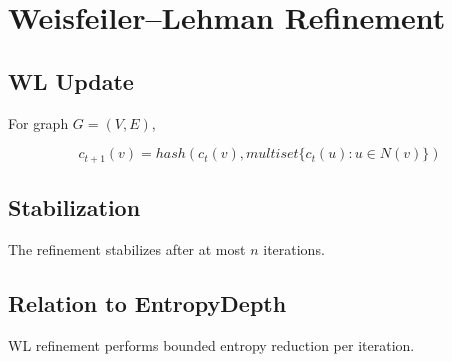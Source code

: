 \chapter{Weisfeiler--Lehman Refinement}

\section{WL Update}

For graph \(G=(V,E)\),

\[
c_{t+1}(v) = hash(c_t(v), multiset\{c_t(u): u \in N(v)\})
\]

\section{Stabilization}

The refinement stabilizes after at most \(n\) iterations.

\section{Relation to EntropyDepth}

WL refinement performs bounded entropy reduction per iteration.
